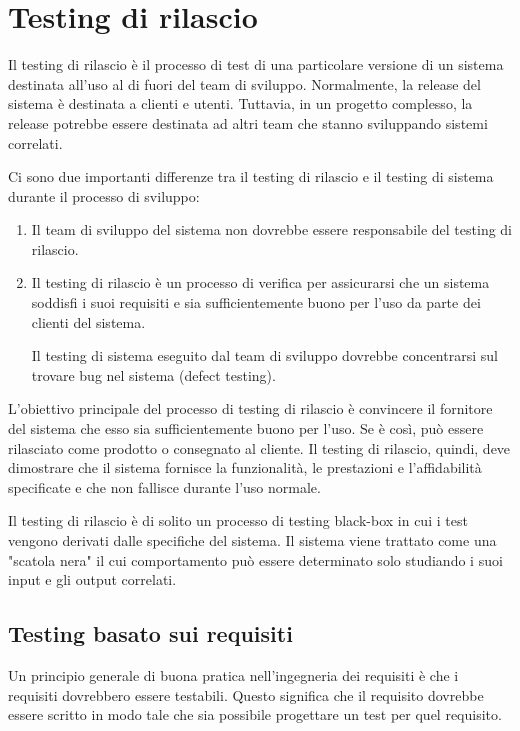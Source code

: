 \section{Testing di rilascio}
Il testing di rilascio è il processo di test di una particolare versione di un sistema destinata all'uso al di fuori del team di sviluppo. Normalmente, la release del sistema è destinata a clienti e utenti. Tuttavia, in un progetto complesso, la release potrebbe essere destinata ad altri team che stanno sviluppando sistemi correlati.

Ci sono due importanti differenze tra il testing di rilascio e il testing di sistema durante il processo di sviluppo:
\begin{enumerate}
    \item Il team di sviluppo del sistema non dovrebbe essere responsabile del testing di rilascio.
    \item Il testing di rilascio è un processo di verifica per assicurarsi che un sistema soddisfi i suoi requisiti e sia sufficientemente buono per l'uso da parte dei clienti del sistema.
    
    Il testing di sistema eseguito dal team di sviluppo dovrebbe concentrarsi sul trovare bug nel sistema (defect testing).
\end{enumerate}
L'obiettivo principale del processo di testing di rilascio è convincere il fornitore del sistema che esso sia sufficientemente buono per l'uso. Se è così, può essere rilasciato come prodotto o consegnato al cliente. Il testing di rilascio, quindi, deve dimostrare che il sistema fornisce la funzionalità, le prestazioni e l'affidabilità specificate e che non fallisce durante l'uso normale.

Il testing di rilascio è di solito un processo di testing black-box in cui i test vengono derivati dalle specifiche del sistema. Il sistema viene trattato come una "scatola nera" il cui comportamento può essere determinato solo studiando i suoi input e gli output correlati.

\subsection{Testing basato sui requisiti}
Un principio generale di buona pratica nell'ingegneria dei requisiti è che i requisiti dovrebbero essere testabili. Questo significa che il requisito dovrebbe essere scritto in modo tale che sia possibile progettare un test per quel requisito.

